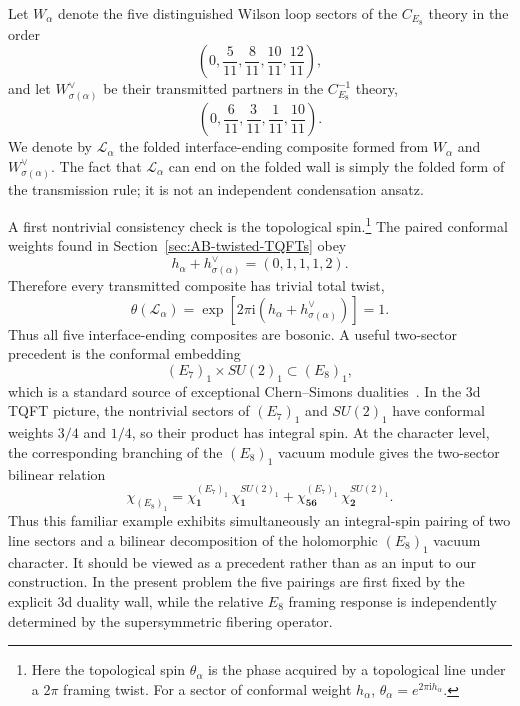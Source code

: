 \documentclass[11pt,a4paper]{article}
\numberwithin{equation}{section}
\begin{document}
Let $W_\alpha$ denote the five distinguished Wilson loop sectors of the $C_{E_8}$ theory in the order
\begin{equation}
  \left(
  0,\frac5{11},\frac8{11},\frac{10}{11},\frac{12}{11}
  \right),
\end{equation}
and let $W^\vee_{\sigma(\alpha)}$ be their transmitted partners in the $C_{E_8}^{-1}$ theory,
\begin{equation}
  \left(
  0,\frac6{11},\frac3{11},\frac1{11},\frac{10}{11}
  \right).
\end{equation}
We denote by $\mathcal L_\alpha$ the folded interface-ending composite formed from $W_\alpha$ and $W^\vee_{\sigma(\alpha)}$.  The fact that $\mathcal L_\alpha$ can end on the folded wall is simply the folded form of the transmission rule; it is not an independent condensation ansatz.

A first nontrivial consistency check is the topological spin.\footnote{Here the topological spin $\theta_\alpha$ is the phase acquired by a topological line under a $2\pi$ framing twist. For a sector of conformal weight $h_\alpha$, $\theta_\alpha=e^{2\pi \mathrm{i}h_\alpha}$.}  The paired conformal weights found in Section~\ref{sec:AB-twisted-TQFTs} obey
\begin{equation}
  h_\alpha+h^\vee_{\sigma(\alpha)}
  =(0,1,1,1,2).
  \label{eq:folded-paired-weight-sums}
\end{equation}
Therefore every transmitted composite has trivial total twist,
\begin{equation}
  \theta(\mathcal L_\alpha)
  =\exp\!\left[2\pi \mathrm{i}\left(
  h_\alpha+h^\vee_{\sigma(\alpha)}
  \right)\right]
  =1.
  \label{eq:folded-trivial-spins}
\end{equation}
Thus all five interface-ending composites are bosonic.  A useful two-sector precedent is the conformal embedding
\begin{equation}
  (E_7)_1\times SU(2)_1\subset(E_8)_1,
  \label{eq:E7-SU2-E8-analogy}
\end{equation}
which is a standard source of exceptional Chern--Simons dualities~\cite{CordovaHsinOhmori:2019Exceptional}.  In the 3d TQFT picture, the nontrivial sectors of $(E_7)_1$ and $SU(2)_1$ have conformal weights $3/4$ and $1/4$, so their product has integral spin.  At the character level, the corresponding branching of the $(E_8)_1$ vacuum module gives the two-sector bilinear relation
\begin{equation}
  \chi_{(E_8)_1}
  =
  \chi^{(E_7)_1}_{\mathbf 1}\,\chi^{SU(2)_1}_{\mathbf 1}
  +
  \chi^{(E_7)_1}_{\mathbf{56}}\,\chi^{SU(2)_1}_{\mathbf 2}.
  \label{eq:E7-SU2-E8-character-bilinear}
\end{equation}
Thus this familiar example exhibits simultaneously an integral-spin pairing of two line sectors and a bilinear decomposition of the holomorphic $(E_8)_1$ vacuum character.  It should be viewed as a precedent rather than as an input to our construction.  In the present problem the five pairings are first fixed by the explicit 3d duality wall, while the relative $E_8$ framing response is independently determined by the supersymmetric fibering operator.
\end{document}
